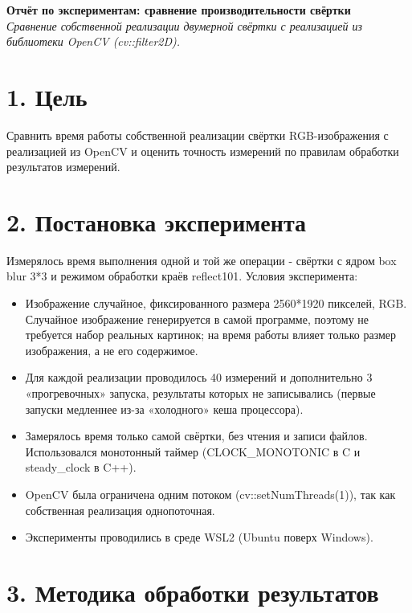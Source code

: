 \documentclass[12pt,a4paper]{article}
\begin{document}
\begin{center}
    {\LARGE\bfseries Отчёт по экспериментам: сравнение производительности свёртки}\\[6pt]
    \textit{Сравнение собственной реализации двумерной свёртки с реализацией из библиотеки OpenCV (cv::filter2D).}
\end{center}

\section*{1. Цель}

Сравнить время работы собственной реализации свёртки RGB-изображения с реализацией из OpenCV и оценить точность измерений по правилам обработки результатов измерений.

\section*{2. Постановка эксперимента}

Измерялось время выполнения одной и той же операции - свёртки с ядром box blur 3*3 и режимом обработки краёв reflect101. Условия эксперимента:

\begin{itemize}
    \item Изображение случайное, фиксированного размера 2560*1920 пикселей, RGB. Случайное изображение генерируется в самой программе, поэтому не требуется набор реальных картинок; на время работы влияет только размер изображения, а не его содержимое.
    \item Для каждой реализации проводилось 40 измерений и дополнительно 3 «прогревочных» запуска, результаты которых не записывались (первые запуски медленнее из-за «холодного» кеша процессора).
    \item Замерялось время только самой свёртки, без чтения и записи файлов. Использовался монотонный таймер (CLOCK\_MONOTONIC в C и steady\_clock в C++).
    \item OpenCV была ограничена одним потоком (cv::setNumThreads(1)), так как собственная реализация однопоточная.
    \item Эксперименты проводились в среде WSL2 (Ubuntu поверх Windows).
\end{itemize}

\section*{3. Методика обработки результатов}
\end{document}
